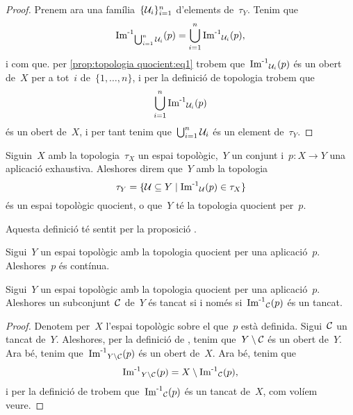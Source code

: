 \documentclass[../../main.tex]{subfiles}
\begin{document}
\begin{proposition}
\begin{proof}
            Prenem ara una família~\(\{\mathcal{U}_{i}\}_{i=1}^{n}\) d'elements de~\(\tau_{Y}\).
            Tenim que
            \[
                \operatorname{\operatorname{Im}^{-1}}_{\bigcup_{i=1}^{n}\mathcal{U}_{i}}(p)=\bigcup_{i=1}^{n}\operatorname{\operatorname{Im}^{-1}}_{\mathcal{U}_{i}}(p),
            \]
            i com que.
            per \eqref{prop:topologia quocient:eq1} trobem que~\(\operatorname{\operatorname{Im}^{-1}}_{\mathcal{U}_{i}}(p)\) és un obert de~\(X\) per a tot~\(i\) de~\(\{1,\dots,n\}\), i per la definició de topologia trobem que
            \[
                \bigcup_{i=1}^{n}\operatorname{\operatorname{Im}^{-1}}_{\mathcal{U}_{i}}(p)
            \]
            és un obert de~\(X\), i per tant tenim que~\(\bigcup_{i=1}^{n}\mathcal{U}_{i}\) és un element de~\(\tau_{Y}\).
        \end{proof}
    \end{proposition}
    \begin{definition}
        \label{def:topologia quocient}
        Siguin~\(X\) amb la topologia~\(\tau_{X}\) un espai topològic,~\(Y\) un conjunt i~\(p\colon X\longrightarrow Y\) una aplicació exhaustiva.
        Aleshores direm que~\(Y\) amb la topologia
        \[
            \tau_{Y}=\{\mathcal{U}\subseteq Y\mid\operatorname{\operatorname{Im}^{-1}}_{\mathcal{U}}(p)\in\tau_{X}\}
        \]
        és un espai topològic quocient, o que~\(Y\) té la topologia quocient per~\(p\).

        Aquesta definició té sentit per la proposició .
    \end{definition}
    \begin{observation}
        \label{obs:l'aplicació que indueix la topologia en un espai quocient és contínua}
        Sigui~\(Y\) un espai topològic amb la topologia quocient per una aplicació~\(p\).
        Aleshores~\(p\) és contínua.
    \end{observation} %
    \begin{proposition}
        \label{prop:la topologia quocient és equivalent per tancats}
        Sigui~\(Y\) un espai topològic amb la topologia quocient per una aplicació~\(p\).
        Aleshores un subconjunt~\(\mathcal{C}\) de~\(Y\) és tancat si i només si~\(\operatorname{\operatorname{Im}^{-1}}_{\mathcal{C}}(p)\) és un tancat.
        \begin{proof} %
            Denotem per~\(X\) l'espai topològic sobre el que~\(p\) està definida.
            Sigui~\(\mathcal{C}\) un tancat de~\(Y\).
            Aleshores, per la definició de , tenim que~\(Y\setminus\mathcal{C}\) és un obert de~\(Y\).
            Ara bé, tenim que~\(\operatorname{\operatorname{Im}^{-1}}_{Y\setminus\mathcal{C}}(p)\) és un obert de~\(X\).
            Ara bé, tenim que
            \[
                \operatorname{\operatorname{Im}^{-1}}_{Y\setminus\mathcal{C}}(p)=X\setminus\operatorname{\operatorname{Im}^{-1}}_{\mathcal{C}}(p),
            \]
            i per la definició de  trobem que~\(\operatorname{\operatorname{Im}^{-1}}_{\mathcal{C}}(p)\) és un tancat de~\(X\), com volíem veure.
        \end{proof}
    \end{proposition}
\end{document}
